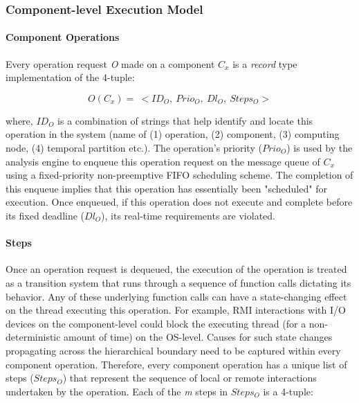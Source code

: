 \subsubsection{Component-level Execution Model}

\paragraph{Component Operations} Every operation request \emph{O} made on a component \emph{$C_x$} is a \emph{record} type implementation of the 4-tuple:

\vspace{-0.1in}
\begin{equation}
O(C_x) = \ < ID_O, \ Prio_O, \ Dl_O, \  Steps_O >
\end{equation}

where, $ID_O$ is a combination of strings that help identify and locate this operation in the system (name of (1) operation, (2) component, (3) computing node, (4) temporal partition etc.). The operation's priority ($Prio_O$) is used by the analysis engine to enqueue this operation request on the message queue of $C_x$ using a fixed-priority non-preemptive FIFO scheduling scheme. The completion of this enqueue implies that this operation has essentially been "scheduled" for execution. Once enqueued, if this operation does not execute and complete before its fixed deadline ($Dl_O$), its real-time requirements are violated. 

\paragraph{Steps} 
\label{para:steps}

Once an operation request is dequeued, the execution of the operation is treated as a transition system that runs through a sequence of function calls dictating its behavior. Any of these underlying function calls can have a state-changing effect on the thread executing this operation. For example, RMI interactions with I/O devices on the component-level could block the executing thread (for a non-deterministic amount of time) on the OS-level. Causes for such state changes propagating across the hierarchical boundary need to be captured within every component operation. Therefore, every component operation has a unique list of steps ($Steps_O$) that represent the sequence of local or remote interactions undertaken by the operation. Each of the \emph{m} steps in $Steps_O$ is a 4-tuple:

